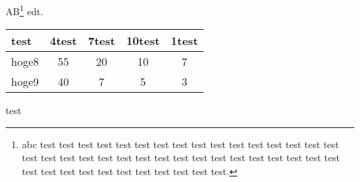 \documentclass[a5paper,12pt]{tarticle}
\begin{document}
AB\footnote{abc test test test test test test test test
test test test test test test test test test test test test
test test test test test test test test test test test test
test test test test test test test test test test test test.} edt.
\begin{table}[b]\centering
\begin{tabular}{|l||c|c|c|c|}\hline
  test  & 4test & 7test & 10test & 1test \\ \hline\hline
  hoge8 &  55   &  20   &  10    &   7   \\ \hline
  hoge9 &  40   &   7   &   5    &   3   \\ \hline
\end{tabular}
\end{table}
test
\end{document}
